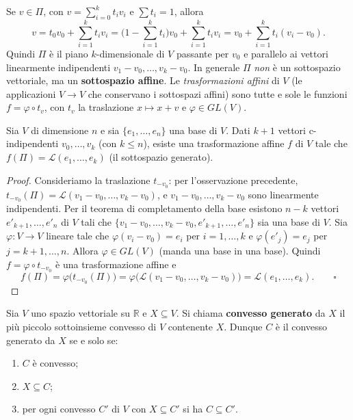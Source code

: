 \begin{observacion}
Se $v \in \Pi$, con $v = \sum_{i=0}^k t_i v_i$ e $\sum t_i = 1$, allora
\[
v = t_0 v_0 + \sum_{i=1}^k t_i v_i = \Big(1 - \sum_{i=1}^k t_i\Big) v_0 + \sum_{i=1}^k t_i v_i = v_0 + \sum_{i=1}^k t_i (v_i - v_0).
\]
Quindi $\Pi$ \`e il piano $k$-dimensionale di $V$ passante per $v_0$ e parallelo ai vettori linearmente indipendenti $v_1 - v_0, \dots, v_k - v_0$. In generale $\Pi$ \emph{non} \`e un sottospazio vettoriale, ma un \textbf{sottospazio affine}. Le \emph{trasformazioni affini} di $V$ (le applicazioni $V \to V$ che conservano i sottospazi affini) sono tutte e sole le funzioni $f = \varphi \circ t_v$, con $t_v$ la traslazione $x \mapsto x + v$ e $\varphi \in GL(V)$.
\end{observacion}

\begin{prop}
Sia $V$ di dimensione $n$ e sia $\{e_1, \dots, e_n\}$ una base di $V$. Dati $k+1$ vettori c-indipendenti $v_0, \dots, v_k$ (con $k \leqslant n$), esiste una trasformazione affine $f$ di $V$ tale che $f(\Pi) = \mathcal{L}(e_1, \dots, e_k)$ (il sottospazio generato).
\end{prop}
\begin{proof}
Consideriamo la traslazione $t_{-v_0}$: per l'osservazione precedente, $t_{-v_0}(\Pi) = \mathcal{L}(v_1 - v_0, \dots, v_k - v_0)$, e $v_1 - v_0, \dots, v_k - v_0$ sono linearmente indipendenti. Per il teorema di completamento della base esistono $n-k$ vettori $e'_{k+1}, \dots, e'_n$ di $V$ tali che $\{ v_1 - v_0, \dots, v_k - v_0, e'_{k+1}, \dots, e'_n \}$ sia una base di $V$. Sia $\varphi: V \to V$ lineare tale che $\varphi(v_i - v_0) = e_i$ per $i = 1, \dots, k$ e $\varphi(e'_j) = e_j$ per $j = k+1, \dots, n$. Allora $\varphi \in GL(V)$ (manda una base in una base). Quindi $f = \varphi \circ t_{-v_0}$ \`e una trasformazione affine e
\[
f(\Pi) = \varphi\big( t_{-v_0}(\Pi) \big) = \varphi\big( \mathcal{L}(v_1 - v_0, \dots, v_k - v_0) \big) = \mathcal{L}(e_1, \dots, e_k) . \qquad \square
\]
\end{proof}

\begin{definicion}
Sia $V$ uno spazio vettoriale su $\mathbb{R}$ e $X \subseteq V$. Si chiama \textbf{convesso generato} da $X$ il pi\`u piccolo sottoinsieme convesso di $V$ contenente $X$. Dunque $C$ \`e il convesso generato da $X$ se e solo se:
\begin{enumerate}
    \item $C$ \`e convesso;
    \item $X \subseteq C$;
    \item per ogni convesso $C'$ di $V$ con $X \subseteq C'$ si ha $C \subseteq C'$.
\end{enumerate}
\end{definicion}

